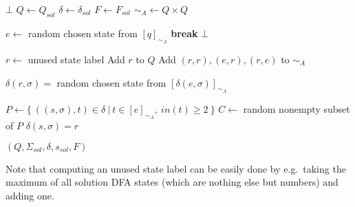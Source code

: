 \vspace{0.2cm}
\begin{spacing}{1}
\begin{algorithmic}[1]
		\State \Return $\bot$
	\EndIf
    \State $Q \gets Q_{sol}$
    \State $\delta \gets \delta_{sol}$
    \State $F \gets F_{sol}$
    \State $\sim_A \gets Q\times Q$
	
	\vspace{0.2cm}
	
    
    	\vspace{0.2cm}
    
		 
				\State $e \gets$ random chosen state from $[q]_{\sim_A}$
				\State \textbf{break}
			\EndIf
		\EndFor
		 \Return $\bot$ \EndIf
		
		\vspace{0.2cm}
		
		\State $r \gets$ unused state label 
        \State Add $r$ to $Q$
		\State Add $(r,r), (e,r), (r,e)$ to $\sim_A$
		
		\vspace{0.2cm}
		
		 
			\State $\delta(r, \sigma) =$ random chosen state from $[\delta(e, \sigma)]_{\sim_A}$
		\EndFor
		
		\vspace{0.2cm}
		
		\State $P \gets \{\ ((s, \sigma), t) \in \delta\ |\ t \in [e]_{\sim_A},\ in(t) \geq 2\ \}$ 
		\State $C \gets$ random nonempty subset of $P$
            \State $\delta(s, \sigma) = r$
		\EndFor
		
		\vspace{0.2cm}
		
	\EndFor
    \State \Return $(Q, \Sigma_{sol}, \delta, s_{sol}, F)$
	\EndFunction
\end{algorithmic}
\end{spacing}
\vspace{0.2cm}
\noindent Note that computing an unused state label can be easily done by e.g.\ taking the maximum of all solution DFA states (which are nothing else but numbers) and adding one.

